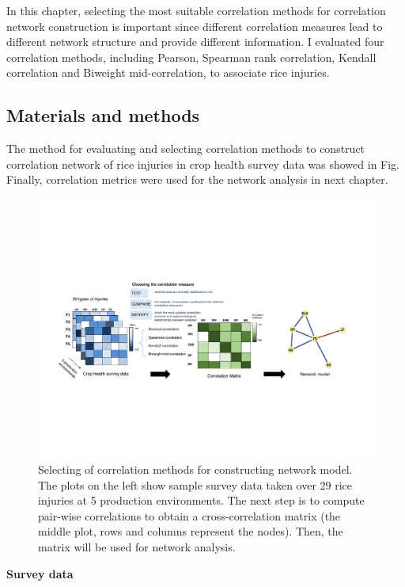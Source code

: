In this chapter, selecting the most suitable correlation methods for correlation network construction is important since different correlation measures lead to different network structure and provide different information. I evaluated four correlation methods, including Pearson, Spearman rank correlation, Kendall correlation \citep{Prokhorov_2001_Kendall} and Biweight mid-correlation, to associate rice injuries. 

\subsection*{Materials and methods}

The method for evaluating and selecting correlation methods to construct correlation network of rice injuries in crop health survey data was showed in Fig. Finally, correlation metrics were used for the network analysis in next chapter.

\begin{figure}
    \centering
     \includegraphics[width = 1\textwidth]{figures/pipeline4/pipeline4.pdf}
    \caption{Selecting of correlation methods for constructing network model. The plots on the left show sample survey data taken over 29 rice injuries at 5 production environments. The next step is to compute pair-wise correlations to obtain a cross-correlation matrix (the middle plot, rows and columns represent the nodes). Then, the matrix will be used for network analysis.}
    \label{fig:pipeline1}
\end{figure}

\textbf{Survey data}

